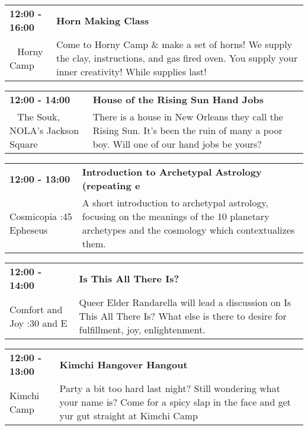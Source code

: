 \begin{tabular}{ p{1in} p{2.2in} }
    \textbf{12:00 - 16:00} & \textbf{Horn Making Class} \\
    ~ \newline Horny Camp & Come to Horny Camp \& make a set of horns! We supply the clay, instructions, and gas fired oven. You supply your inner creativity! While supplies last! \\
    \hline 
\end{tabular}
    
\begin{tabular}{ p{1in} p{2.2in} }
    \textbf{12:00 - 14:00} & \textbf{House of the Rising Sun Hand Jobs} \\
    ~ \newline The Souk, NOLA's Jackson Square  & There is a house in New Orleans they call the Rising Sun. It's been the ruin of many a poor boy. Will one of our hand jobs be yours? \\
    \hline 
\end{tabular}
    
\begin{tabular}{ p{1in} p{2.2in} }
    \textbf{12:00 - 13:00} & \textbf{Introduction to Archetypal Astrology (repeating e} \\
    Cosmicopia \newline 3:45 Epheseus & A short introduction to archetypal astrology, focusing on the meanings of the 10 planetary archetypes and the cosmology which contextualizes them. \\
    \hline 
\end{tabular}
    
\begin{tabular}{ p{1in} p{2.2in} }
    \textbf{12:00 - 14:00} & \textbf{Is This All There Is?} \\
    Comfort and Joy \newline 7:30 and E & Queer Elder Randarella will lead a discussion on Is This All There Is? What else is there to desire for fulfillment, joy, enlightenment. \\
    \hline 
\end{tabular}
    
\begin{tabular}{ p{1in} p{2.2in} }
    \textbf{12:00 - 13:00} & \textbf{Kimchi Hangover Hangout} \\
    Kimchi Camp \newline  & Party a bit too hard last night? Still wondering what your name is? Come for a spicy slap in the face and get yur gut straight at Kimchi Camp \\
    \hline 
\end{tabular}
    
